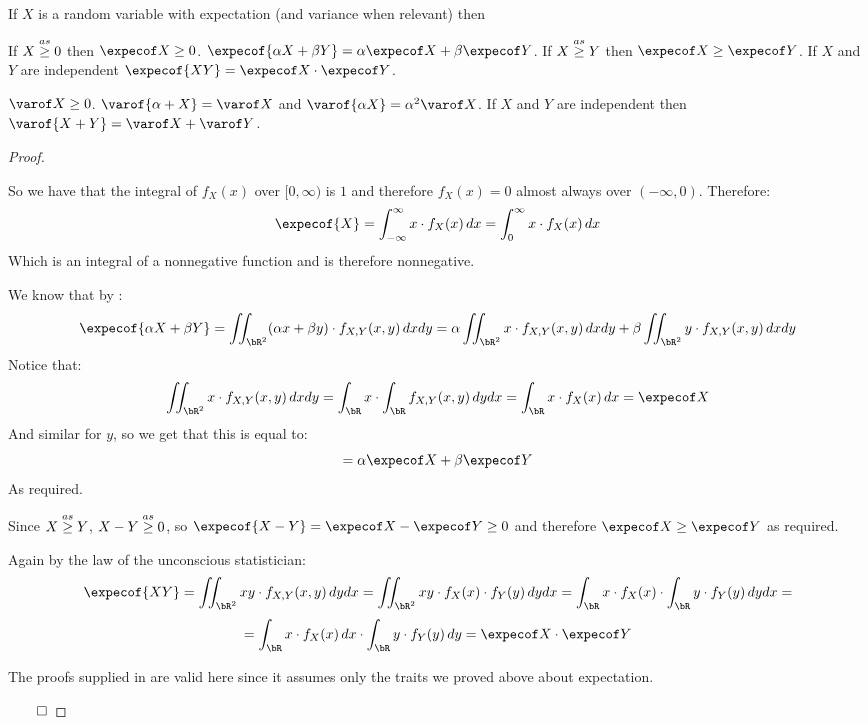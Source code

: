 \begin{thrm*}

	If $X$ is a random variable with expectation (and variance when relevant) then
	\begin{msecenumerate}
		\mitem If $X\mathrel{\overset{as}\geq}0$ then $\expecof X\geq0$.
		\mitem $\expecof{\alpha X+\beta Y}=\alpha\expecof X+\beta\expecof Y$.
		\mitem If $X\mathrel{\overset{as}\geq} Y$ then $\expecof X\geq\expecof Y$.
		\mitem If $X$ and $Y$ are independent $\expecof{XY}=\expecof X\cdot\expecof Y$.

		\mitem $\varof X\geq0$.
		\mitem $\varof{\alpha + X}=\varof X$ and $\varof{\alpha X}=\alpha^2\varof X$.
		\mitem If $X$ and $Y$ are independent then $\varof{X+Y}=\varof X+\varof Y$.
	\end{msecenumerate}

\end{thrm*}

\begin{proof}

	\begin{msecenumerate}[0pt]
		\mitem So we have that the integral of $f_X(x)$ over $[0,\infty)$ is $1$ and therefore $f_X(x)=0$ almost always over $(-\infty,0)$.
			Therefore:
			\[ \expecof{X} = \int_{-\infty}^\infty x\cdot f_X(x)\,dx = \int_0^\infty x\cdot f_X(x)\,dx \]
			Which is an integral of a nonnegative function and is therefore nonnegative.

		\mitem We know that by \ppref{contlotusTheorem}:
			\[ \expecof{\alpha X+\beta Y} = \iint_{\bR^2}(\alpha x+\beta y)\cdot f_{X,Y}(x,y)\,dx dy =
			\alpha\iint_{\bR^2}x\cdot f_{X,Y}(x,y)\,dx dy + \beta\iint_{\bR^2} y\cdot f_{X,Y}(x,y)\,dx dy \]
			Notice that:
			\[ \iint_{\bR^2} x\cdot f_{X,Y}(x,y)\,dx dy = \int_\bR x\cdot \int_\bR f_{X,Y}(x,y)\,dy dx = \int_\bR x\cdot f_X(x)\,dx = \expecof X \]
			And similar for $y$, so we get that this is equal to:
			\[ = \alpha\expecof X + \beta\expecof Y \]
			As required.

		\mitem Since $X\mathrel{\overset{as}\geq} Y$, $X-Y\mathrel{\overset{as}\geq}0$, so $\expecof{X-Y}=\expecof X-\expecof Y\geq 0$ and therefore $\expecof X\geq \expecof Y$ as required.

		\mitem Again by the law of the unconscious statistician:
			\[ \expecof{XY} = \iint_{\bR^2}xy\cdot f_{X,Y}(x,y)\,dy dx = \iint_{\bR^2}xy\cdot f_X(x)\cdot f_Y(y)\,dy dx =
			\int_\bR x\cdot f_X(x)\cdot \int_\bR y\cdot f_Y(y)\,dy dx = \]
			\[ = \int_\bR x\cdot f_X(x)\,dx \cdot \int_\bR y\cdot f_Y(y)\,dy = \expecof X\cdot\expecof Y \]

		\mitem The proofs supplied in  are valid here since it assumes only the traits we proved above about expectation.
	\end{msecenumerate}

	\hfill$\qed$

\end{proof}

